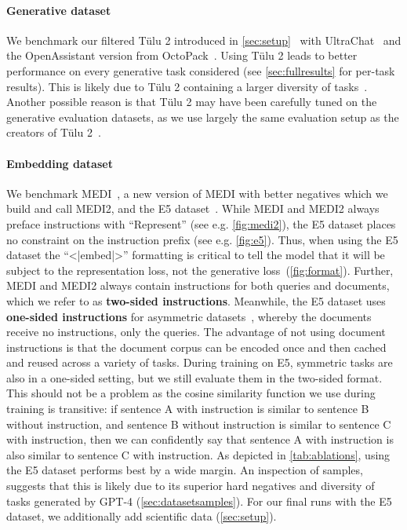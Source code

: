 \documentclass{article}
\newcommand{\tulu}{T\"ulu}
\begin{document}
\paragraph{Generative dataset} We benchmark our filtered \tulu{} 2 introduced in \autoref{sec:setup}~\cite{ivison2023camels} with UltraChat~\cite{ding2023enhancing,tunstall2023zephyr} and the OpenAssistant version from OctoPack~\cite{muennighoff2023octopack,köpf2023openassistant,longpre2023data}. Using \tulu{} 2 leads to better performance on every generative task considered (see \autoref{sec:fullresults} for per-task results). This is likely due to \tulu{} 2 containing a larger diversity of tasks~\cite{ivison2023camels}. Another possible reason is that \tulu{} 2 may have been carefully tuned on the generative evaluation datasets, as we use largely the same evaluation setup as the creators of \tulu{} 2~\cite{ivison2023camels}.

\paragraph{Embedding dataset} We benchmark MEDI~\cite{su2023embedder}, a new version of MEDI with better negatives which we build and call MEDI2, and the E5 dataset~\cite{wang2024improving}. While MEDI and MEDI2 always preface instructions with ``Represent'' (see e.g. \autoref{fig:medi2}), the E5 dataset places no constraint on the instruction prefix (see e.g. \autoref{fig:e5}). Thus, when using the E5 dataset the ``<|embed|>'' formatting is critical to tell the model that it will be subject to the representation loss, not the generative loss~(\autoref{fig:format}). Further, MEDI and MEDI2 always contain instructions for both queries and documents, which we refer to as \textbf{two-sided instructions}. Meanwhile, the E5 dataset uses \textbf{one-sided instructions} for asymmetric datasets~\cite{muennighoff2022sgpt}, whereby the documents receive no instructions, only the queries. The advantage of not using document instructions is that the document corpus can be encoded once and then cached and reused across a variety of tasks. During training on E5, symmetric tasks are also in a one-sided setting, but we still evaluate them in the two-sided format. This should not be a problem as the cosine similarity function we use during training is transitive: if sentence A with instruction is similar to sentence B without instruction, and sentence B without instruction is similar to sentence C with instruction, then we can confidently say that sentence A with instruction is also similar to sentence C with instruction. As depicted in \autoref{tab:ablations}, using the E5 dataset performs best by a wide margin. An inspection of samples, suggests that this is likely due to its superior hard negatives and diversity of tasks generated by GPT-4 (\autoref{sec:datasetsamples}). For our final runs with the E5 dataset, we additionally add scientific data (\autoref{sec:setup}).
\end{document}
